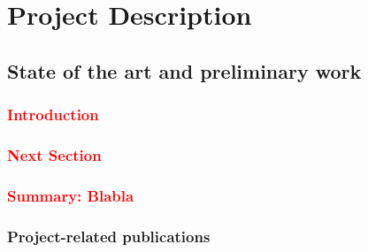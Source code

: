 \documentclass[a4paper,11pt,numbers=noenddot,parskip=half-]{scrreprt}
\begin{document}
\addtocounter{chapter}{1}

\chapter{Project Description}

\section{State of the art and preliminary work}\label{sec:stateofart}


\subsection*{\textcolor{red}{Introduction}}\label{sec:stateofart:intro}
\myblindtext[2]


\subsection*{\textcolor{red}{Next Section}}\label{sec:stateofart:nextsection}
\myblindtext[8]

\begin{figure}[ht]
\begin{center}
  \caption{\myblindtext}
  \label{fig:somefigure}
\end{center}
\end{figure}


\subsection*{\textcolor{red}{Summary: Blabla}}\label{sec:stateofart:summary}
\myblindtext[2]



\subsection{Project-related publications}
\end{document}
